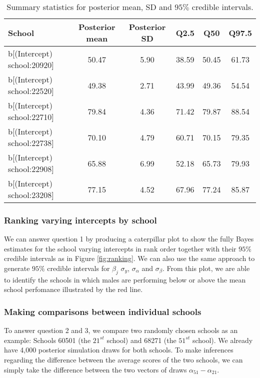 \begin{table}[ht]
	\centering
	\def\arraystretch{1.3}
	{\small
		\begin{tabular}{l | c c c c c}
			School & Posterior mean & Posterior SD & Q2.5 & Q50 & Q97.5\\
			\hline
			b[(Intercept) school:20920] & 50.47 & 5.90 & 38.59 & 50.45 & 61.73 \\
			b[(Intercept) school:22520] & 49.38 & 2.71 & 43.99 & 49.36 & 54.54 \\
			b[(Intercept) school:22710] & 79.84 & 4.36 &  71.42 & 79.87 & 88.54 \\
			b[(Intercept) school:22738] & 70.10 & 4.79 & 60.71 & 70.15 & 79.35  \\
			b[(Intercept) school:22908] & 65.88 & 6.99 & 52.18 & 65.73 & 79.93 \\
			b[(Intercept) school:23208] &  77.15 & 4.52 & 67.96 & 77.24 & 85.87
		\end{tabular}
	}
	\caption{{\small Summary statistics for posterior mean, SD and $95\%$ credible intervals.}}
	\label{tab:summary_data}
\end{table}

\subsubsection{Ranking varying intercepts by school}

We can answer question 1 by producing a caterpillar plot to show the fully Bayes estimates for the school varying intercepts in rank order together with their $95\%$ credible intervals as in Figure \ref{fig:ranking}. We can also use the same approach to generate $95\%$ credible intervals for $\beta_j$ $\sigma_y$, $\sigma_\alpha$ and $\sigma_\beta$. From this plot, we are able to identify the schools in which males are performing below or above the mean school perfomance illustrated by the red line.

\subsubsection{Making comparisons between individual schools}

To answer question 2 and 3, we compare two randomly chosen schools as an example: Schools 60501 (the $21^{st}$ school) and 68271 (the $51^{st}$ school). We already have 4,000 posterior simulation draws for both schools. To make inferences regarding the difference between the average scores of the two schools, we can simply take the difference between the two vectors of draws $\alpha_{51} - \alpha_{21}$.

